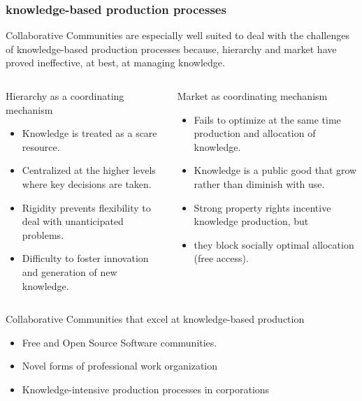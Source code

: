 \documentclass[ignorenonframetext,red,8pt,notes=hide]{beamer}
\begin{document}
\begin{frame}
\frametitle{knowledge-based production processes}
Collaborative Communities are especially well suited to deal with the challenges of knowledge-based production processes because, hierarchy and market have proved ineffective, at best, at managing knowledge.  

\begin{columns}[c]

\begin{column}{0.5\textwidth}
\begin{block}{Hierarchy as a coordinating mechanism}
\begin{itemize}
\item Knowledge is treated as a scare resource.
\item Centralized at the higher levels where key decisions are taken.
\item Rigidity prevents flexibility to deal with unanticipated problems.
\item Difficulty to foster innovation and generation of new knowledge.
\end{itemize}
\end{block}
\end{column}

\pause

\begin{column}{0.5\textwidth}
\begin{block}{Market as coordinating mechanism}
\begin{itemize}
\item Fails to optimize at the same time production and allocation of knowledge.
\item Knowledge is a public good that grow rather than diminish with use.
\item Strong property rights incentive knowledge production, but
\item they block socially optimal allocation (free access).
\end{itemize}
\end{block}
\end{column}

\end{columns}

\pause

\begin{block}{Collaborative Communities that excel at knowledge-based production}
\begin{itemize}
\item Free and Open Source Software communities.
\item Novel forms of professional work organization \citep*{adler:2008}
\item Knowledge-intensive production processes in corporations \citep{adler:2006}
\end{itemize}
\end{block}


\end{frame}
\end{document}
